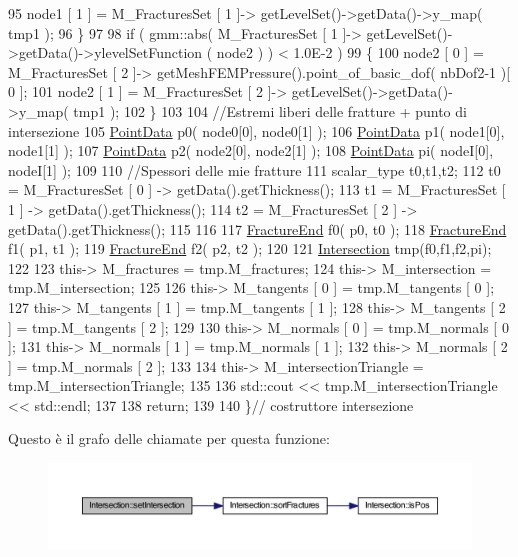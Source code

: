\begin{DoxyCode}
95         node1 [ 1 ] = M\_FracturesSet [ 1 ]-> getLevelSet()->getData()->y\_map( tmp1 );
96     \}
97 
98     \textcolor{keywordflow}{if} ( gmm::abs( M\_FracturesSet [ 1 ]-> getLevelSet()->getData()->ylevelSetFunction ( node2 ) ) < 1.0E-2 
      )
99     \{
100         node2 [ 0 ] = M\_FracturesSet [ 2 ]-> getMeshFEMPressure().point\_of\_basic\_dof( nbDof2-1 )[ 0 ];
101         node2 [ 1 ] = M\_FracturesSet [ 2 ]-> getLevelSet()->getData()->y\_map( tmp1 );
102     \}
103 
104     \textcolor{comment}{//Estremi liberi delle fratture +  punto di intersezione}
105     \hyperlink{classPointData}{PointData} p0( node0[0], node0[1] );
106     \hyperlink{classPointData}{PointData} p1( node1[0], node1[1] );
107     \hyperlink{classPointData}{PointData} p2( node2[0], node2[1] );
108     \hyperlink{classPointData}{PointData} pi( nodeI[0], nodeI[1] );
109     
110     \textcolor{comment}{//Spessori delle mie fratture}
111     scalar\_type t0,t1,t2;
112     t0 = M\_FracturesSet [ 0 ] -> getData().getThickness();
113     t1 = M\_FracturesSet [ 1 ] -> getData().getThickness();
114     t2 = M\_FracturesSet [ 2 ] -> getData().getThickness();
115     
116 
117     \hyperlink{classFractureEnd}{FractureEnd} f0( p0, t0 );
118     \hyperlink{classFractureEnd}{FractureEnd} f1( p1, t1 );
119     \hyperlink{classFractureEnd}{FractureEnd} f2( p2, t2 );
120     
121     \hyperlink{classIntersection}{Intersection} tmp(f0,f1,f2,pi);
122     
123     this-> M\_fractures = tmp.M\_fractures;
124     this-> M\_intersection = tmp.M\_intersection;
125     
126     this-> M\_tangents [ 0 ] = tmp.M\_tangents [ 0 ];
127     this-> M\_tangents [ 1 ] = tmp.M\_tangents [ 1 ];
128     this-> M\_tangents [ 2 ] = tmp.M\_tangents [ 2 ];
129     
130     this-> M\_normals [ 0 ] = tmp.M\_normals [ 0 ];
131     this-> M\_normals [ 1 ] = tmp.M\_normals [ 1 ];
132     this-> M\_normals [ 2 ] = tmp.M\_normals [ 2 ];
133     
134     this-> M\_intersectionTriangle = tmp.M\_intersectionTriangle; 
135     
136     std::cout << tmp.M\_intersectionTriangle << std::endl;
137     
138     \textcolor{keywordflow}{return};
139     
140 \}\textcolor{comment}{// costruttore intersezione}
\end{DoxyCode}


Questo è il grafo delle chiamate per questa funzione\-:\nopagebreak
\begin{figure}[H]
\begin{center}
\leavevmode
\includegraphics[width=350pt]{classIntersection_ab7a139ac5712a9aa8bb925caf4ecc8af_cgraph}
\end{center}
\end{figure}




